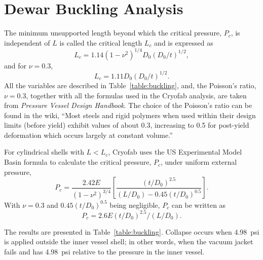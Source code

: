 \section{Dewar Buckling Analysis}
\label{app:buckling}

The minimum unsupported length beyond which the critical pressure, $P_c$, is independent of $L$
is called the critical length $L_c$ and is expressed as
\begin{equation}
    L_c = 1.14(1-\nu^2)^{1/4}D_0(D_0/t)^{1/2},
\end{equation}
and for $\nu=0.3$,
\begin{equation}
    \label{eq:critical_l}
    L_c = 1.11D_0(D_0/t)^{1/2}.
\end{equation}
All the variables are described in Table~\ref{table:buckling}, and, 
the Poisson's ratio, $\nu= 0.3$, together with all the formulas used in the Cryofab analysis,
are taken from \textit{Pressure Vessel Design Handbook}.
The choice of the Poisson's ratio can be found in the wiki,
``Most steels and rigid polymers when used within their design limits (before yield) 
exhibit values of about 0.3, increasing to 0.5 for post-yield deformation which occurs 
largely at constant volume.''



For cylindrical shells with $L<L_c$,
Cryofab uses the US Experimental Model Basin formula to calculate the critical pressure, $P_c$,
under uniform external pressure,
\begin{equation}
    P_c = \frac{2.42E}{(1-\nu^2)^{3/4}}\left[\frac{(t/D_0)^{2.5}}{(L/D_0)-0.45(t/D_0)^{0.5}}\right].
\end{equation}
With $\nu = 0.3$ and $0.45(t/D_0)^{0.5}$ being negligible, $P_c$ can be written as
\begin{equation}
    \label{eq:critical_P}
    P_c = 2.6E(t/D_0)^{2.5}/(L/D_0).
\end{equation}

The results are presented in Table~\ref{table:buckling}.
Collapse occurs when 4.98~psi is applied outside the inner vessel shell; in other words,
when the vacuum jacket fails and has 4.98~psi relative to the pressure in the inner vessel.

%
%
%